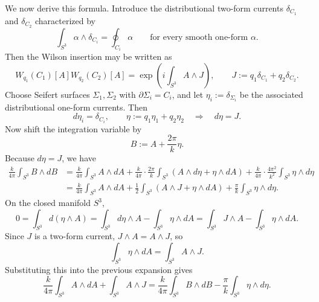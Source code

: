 \documentclass[11pt]{article}
\theoremstyle{definition}
\numberwithin{theorem}{section}
\numberwithin{equation}{section}
\begin{document}
\begin{example}
\noindent We now derive this formula. Introduce the distributional two-form currents $\delta_{C_1}$ and $\delta_{C_2}$ characterized by
\begin{equation*}
\int_{S^3}\alpha\wedge \delta_{C_i} = \oint_{C_i}\alpha
\qquad
\text{for every smooth one-form }\alpha.
\end{equation*}
Then the Wilson insertion may be written as
\begin{equation*}
W_{q_1}(C_1)[A]W_{q_2}(C_2)[A]
=
\exp\left(i\int_{S^3}A\wedge J\right),
\qquad
J := q_1\delta_{C_1} + q_2\delta_{C_2}.
\end{equation*}
Choose Seifert surfaces $\Sigma_1,\Sigma_2$ with $\partial \Sigma_i = C_i$, and let $\eta_i := \delta_{\Sigma_i}$ be the associated distributional one-form currents. Then
\begin{equation*}
d\eta_i = \delta_{C_i},
\qquad
\eta := q_1\eta_1 + q_2\eta_2
\quad\Longrightarrow\quad
d\eta = J.
\end{equation*}
Now shift the integration variable by
\begin{equation*}
B := A + \frac{2\pi}{k}\eta.
\end{equation*}
Because $d\eta = J$, we have
\begin{align*}
\frac{k}{4\pi}\int_{S^3} B\wedge dB
&=
\frac{k}{4\pi}\int_{S^3} A\wedge dA
+ \frac{k}{4\pi}\cdot \frac{2\pi}{k}\int_{S^3}\left(A\wedge d\eta + \eta\wedge dA\right)
+ \frac{k}{4\pi}\cdot \frac{4\pi^2}{k^2}\int_{S^3}\eta\wedge d\eta \\
&=
\frac{k}{4\pi}\int_{S^3} A\wedge dA
+ \frac{1}{2}\int_{S^3}\left(A\wedge J + \eta\wedge dA\right)
+ \frac{\pi}{k}\int_{S^3}\eta\wedge d\eta.
\end{align*}
On the closed manifold $S^3$,
\begin{equation*}
0 = \int_{S^3} d(\eta\wedge A)
= \int_{S^3} d\eta\wedge A - \int_{S^3}\eta\wedge dA
= \int_{S^3} J\wedge A - \int_{S^3}\eta\wedge dA.
\end{equation*}
Since $J$ is a two-form current, $J\wedge A = A\wedge J$, so
\begin{equation*}
\int_{S^3}\eta\wedge dA = \int_{S^3}A\wedge J.
\end{equation*}
Substituting this into the previous expansion gives
\begin{equation}\label{eq:completed-square-abelian}
\frac{k}{4\pi}\int_{S^3} A\wedge dA + \int_{S^3}A\wedge J
=
\frac{k}{4\pi}\int_{S^3} B\wedge dB - \frac{\pi}{k}\int_{S^3}\eta\wedge d\eta.
\end{equation}


\end{example}
\end{document}
